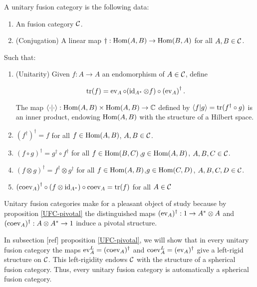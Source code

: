 \begin{defn} A unitary fusion category is the following data:

\begin{enumerate}
\item An fusion category ${\mathcal C}$.
\item (Conjugation) A linear map $\dagger: \operatorname{Hom}(A,B)\to \operatorname{Hom}(B,A)$ for all $A,B\in {\mathcal C}$.
\end{enumerate}

Such that:

\begin{enumerate}
\item (Unitarity) Given $f:A\to A$ an endomorphism of $A\in {\mathcal C}$, define


$$\operatorname{tr}(f)=\operatorname{ev}_A \circ (\operatorname{id}_{A^*}\otimes f)\circ \left(\operatorname{ev}_A\right)^{\dagger}.$$

The map $\left<\cdot|\cdot\right>:\operatorname{Hom}(A,B)\times \operatorname{Hom}(A,B)\to {\mathbb C}$ defined by $\left<f|g\right>=\operatorname{tr}(f^{\dagger}\circ g)$ is an inner product, endowing $\operatorname{Hom}(A,B)$ with the structure of a Hilbert space.
\item $\left(f^{\dagger}\right)^{\dagger}=f$ for all $f\in \operatorname{Hom}(A,B)$, $A,B\in {\mathcal C}$.

\item $(f\circ g)^{\dagger}=g^{\dagger}\circ f^{\dagger}$ for all $f\in \operatorname{Hom}(B,C)$,$g\in \operatorname{Hom}(A,B)$, $A,B,C\in {\mathcal C}$.

\item $(f\otimes g)^{\dagger}=f^{\dagger}\otimes g^{\dagger}$ for all $f\in \operatorname{Hom}(A,B)$,$g\in \operatorname{Hom}(C,D)$, $A,B,C,D\in {\mathcal C}$.
\item $\left(\operatorname{coev}_A\right)^{\dagger}\circ (f \otimes \operatorname{id}_{A^*})\circ \operatorname{coev}_A=\operatorname{tr}(f)$ for all $A\in {\mathcal C}$
\end{enumerate}
\end{defn}

\begin{rem}
Unitary fusion categories make for a pleasant object of study because by proposition \ref{UFC-pivotal} the distinguished maps $(\operatorname{ev}_A)^{\dagger}:1\to A^{*}\otimes A$ and $(\operatorname{coev}_A)^{\dagger}:A\otimes A^{*}\to 1$ induce a pivotal structure.
\end{rem}

\begin{rem} In subsection [ref] proposition \ref{UFC-pivotal}, we will show that in every unitary fusion category the maps $\operatorname{ev}_{A}^L = (\operatorname{coev}_{A})^{\dagger}$ and $\operatorname{coev}^L_{A}=(\operatorname{ev}_A)^{\dagger}$ give a left-rigid structure on ${\mathcal C}$. This left-rigidity endows ${\mathcal C}$ with the structure of a spherical fusion category. Thus, every unitary fusion category is automatically a spherical fusion category.
\end{rem}

